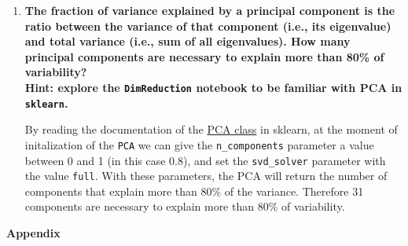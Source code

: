 \documentclass[12pt]{article}
\begin{document}
\begin{enumerate}[leftmargin=\labelsep]
    \item {\color{questioncolor}\bfseries
          The fraction of variance explained by a principal component is the ratio
          between the variance of that component (i.e., its eigenvalue) and total
          variance (i.e., sum of all eigenvalues).
          How many principal components are necessary to explain more than 80\%
          of variability?\\
          Hint: explore the \texttt{DimReduction} notebook to be familiar
          with PCA in \texttt{sklearn}.
          }\\
          \vspace{0.5em}

          By reading the documentation of the \href{https://scikit-learn.org/stable/modules/generated/sklearn.decomposition.PCA.html}{PCA class} in sklearn,
          at the moment of initalization of the \texttt{PCA} we can give the \texttt{n\_components} parameter a value between 0 and 1 (in this case 0.8),
          and set the \texttt{svd\_solver} parameter with the value \texttt{full}.
          With these parameters, the PCA will return the number of components that explain more than 80\% of the variance.
          Therefore 31 components are necessary to explain more than 80\% of variability.

\end{enumerate}

\pagebreak

\center\large{\textbf{Appendix}\vskip 0.3cm}



\vspace*{1.5cm}



\vspace*{1.5cm}


\end{document}
